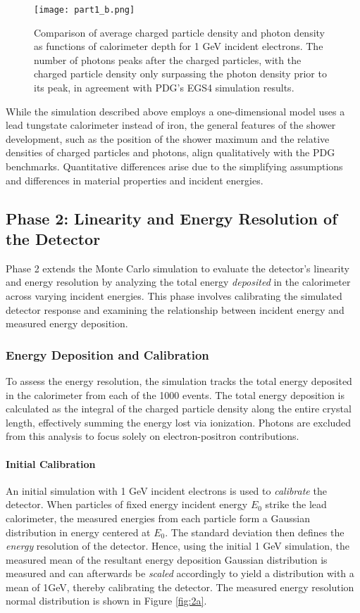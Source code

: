 \documentclass[twocolumn]{aastex631}
\begin{document}
\begin{figure}[htp]
  \centering
    \texttt{[image: part1\_b.png]}
    \caption{Comparison of average charged particle density and photon density
        as functions of calorimeter depth for 1 GeV incident electrons. The
        number of photons peaks after the charged particles, with the charged particle
        density only surpassing the photon density prior to its peak, in agreement
    with PDG’s EGS4 simulation results.}
    \label{fig:1b}
\end{figure}

While the simulation described above employs a one-dimensional model uses a lead
tungstate calorimeter instead of iron,
the general features of the shower development, such as the position of the
shower maximum and the relative densities of charged particles and photons, 
align qualitatively with the PDG benchmarks. Quantitative
differences arise due to the simplifying assumptions and differences in material
properties and incident energies. 

\subsection{Phase 2: Linearity and Energy Resolution of the Detector} 

Phase 2 extends the Monte Carlo simulation to evaluate the detector's linearity
and energy resolution by analyzing the total energy \textit{deposited} in the
calorimeter across varying incident energies. This phase involves calibrating
the simulated detector response and examining the relationship between incident
energy and measured energy deposition. 

\subsubsection{Energy Deposition and Calibration} 

To assess the energy resolution, the simulation tracks the total energy
deposited in the calorimeter from each of the 1000 events. The total energy
deposition is calculated as the integral of the charged particle density along
the entire crystal length, effectively summing the energy lost via ionization.
Photons are excluded from this analysis to focus solely on electron-positron
contributions. 

\paragraph{Initial Calibration} An initial simulation with 1 GeV incident
electrons is used to \textit{calibrate} the detector. When particles of fixed
energy incident energy $E_0$ strike the lead calorimeter, the measured energies from
each particle form a Gaussian distribution in energy centered at $E_0$. The
standard deviation then defines the \textit{energy}
resolution of the detector. Hence, using the initial 1 GeV simulation, the
measured mean of the resultant energy deposition Gaussian distribution is
measured and can afterwards be \textit{scaled} accordingly to yield a
distribution with a mean of 1GeV, thereby calibrating the detector. The measured 
energy resolution normal distribution is shown in Figure \ref{fig:2a}. 
\end{document}
